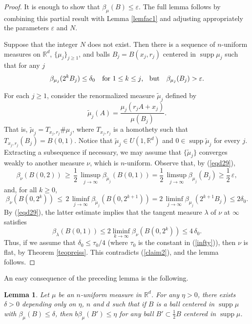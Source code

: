 \documentclass[11pt]{amsart}
\newcommand{\R}{{\mathbb R}}       %
\newcommand{\rf}[1]{{(\ref{#1})}}
\newcommand{\supp}{\operatorname{supp}}
\newcommand{\ve}{{\varepsilon}}
\newcommand{\vv}{{\vspace{2mm}}}
\newcommand{\wt}[1]{{\widetilde{#1}}}
\newtheorem{lemma}[theorem]{Lemma}
\theoremstyle{definition}
\theoremstyle{remark}
\numberwithin{equation}{section}
\begin{document}
\begin{proof}
It is enough to show that $\beta_{\mu}(B)\leq\ve$. The full lemma
follows by combining this partial result with Lemma \ref{lemfac1} and adjusting appropriately the parameters
$\ve$ and $N$.

Suppose that the integer $N$ does not exist. Then there is a sequence of $n$-uniform measures on
$\R^d$, $\{\mu_j\}_{j\geq1}$,
and balls $B_j=B(x_j,r_j)$ centered in  $\supp\mu_j$ such that
for any $j$
$$\beta_{\mu_j}(2^kB_j)\leq \delta_0\quad \mbox{for
$1\leq k\leq j$,\;\; but}\quad \beta_{\mu_j}(B_j)>\ve.$$


For each $j\geq1$, consider the renormalized
measure $\wt \mu_j$ defined by
$$
\wt \mu_j(A) = \frac{\mu_j(r_jA + x_j)}{\mu(B_j)}.
$$
That is, $\wt\mu_j=T_{x_j,r_j}\#\mu_j$, where $T_{x_j,r_j}$ is a homothety such that $T_{x_j,r_j}(B_j)
=B(0,1)$. Notice that $\wt\mu_j\in U(1,\R^d)$ and $0\in\supp\wt\mu_j$ for every $j$.
Extracting a subsequence if necessary, we may assume that
$\{\wt \mu_j\}$ converges weakly to another measure $\nu$, which is 
$n$-uniform. Observe that, by \rf{eqd29},
\begin{equation}\label{claim2}
\beta_\nu(B(0,2))\, \geq \,\frac12
\,\limsup_{j\to\infty}\beta_{\wt \mu_j}( B(0,1)) =
\frac12\,\limsup_{j\to\infty} \beta_{\mu_j}(B_j)\geq \frac12\,\ve,
\end{equation}
and, for all $k\geq0$,
\begin{equation}\label{claim1}
\beta_\nu(B(0,2^k))\, \leq \,
2\,\liminf_{j\to\infty}\beta_{\wt \mu_j}(B(0,2^{k+1})) =
2\,\liminf_{j\to\infty} \beta_{\mu_j}(2^{k+1} B_j)\leq 2\delta_0.
\end{equation}
By \rf{eqd29}, the latter estimate implies that the
 tangent measure $\lambda$ of $\nu$ at $\infty$
satisfies
$$\beta_\lambda(B(0,1))\leq 2 \liminf_{k\to\infty} \beta_\nu(B(0,2^k))\leq 4\,\delta_0.$$
Thus, if we assume that $\delta_0\leq\tau_0/4$ (where $\tau_0$ is the constant in \rf{infty}), 
then $\nu$ is flat, by
Theorem \ref{teopreiss}. This contradicts \rf{claim2}, and the lemma
follows.
\end{proof}


\vv

An easy consequence of the preceding lemma is the following.

\begin{lemma}\label{mthhh}
Let $\mu$ be an $n$-uniform measure in $\R^d$.
For any $\eta>0$, there exists $\delta>0$ depending only on $\eta$, $n$ and $d$
 such that if $B$ is a ball centered in  $\supp\mu$ with
$\beta_{\mu}(B)\leq\delta$, then $b\beta_{\mu}(B')\leq\eta$
for any ball $B'\subset \frac12B$ centered in  $\supp\mu$.
\end{lemma}
\vv
\end{document}

